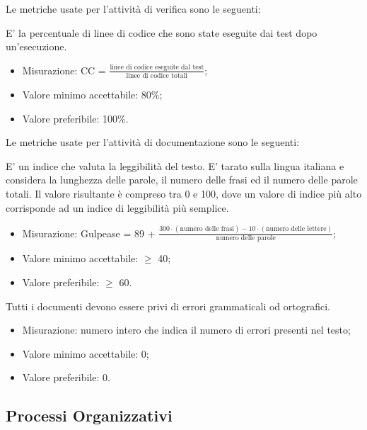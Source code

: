 	Le metriche usate per l'attività di verifica sono le seguenti:
	
		 E' la percentuale di linee di codice che sono state eseguite dai test dopo un’esecuzione.
		 \begin{itemize}
			\item{Misurazione: CC = $\displaystyle\frac{\mbox{linee di codice eseguite dal test}}{\mbox{linee di codice totali}}$;}
			\item{Valore minimo accettabile: 80\%;}
			\item{Valore preferibile: 100\%.}
		\end{itemize}
	
	Le metriche usate per l'attività di documentazione sono le seguenti:
	
		E' un indice che valuta la leggibilità del testo. E' tarato sulla lingua italiana e considera la lunghezza delle parole, il numero delle frasi ed il numero delle parole totali. Il valore risultante è compreso tra 0 e 100, dove un valore di indice più alto corrisponde ad un indice di leggibilità più semplice.
		 \begin{itemize}
			\item{Misurazione: Gulpease = 89 + $\displaystyle\frac{300 \cdot{} (\mbox{numero delle frasi}) - 10 \cdot{} (\mbox{numero delle lettere})}{\mbox{numero delle parole}}$;}
			\item{Valore minimo accettabile: $\geq$ 40;}
			\item{Valore preferibile: $\geq$ 60.}
		\end{itemize}

		Tutti i documenti devono essere privi di errori grammaticali od ortografici.
		\begin{itemize}
			\item{Misurazione: numero intero che indica il numero di errori presenti nel testo;}
			\item{Valore minimo accettabile: 0;}
			\item{Valore preferibile: 0.}
		\end{itemize}

\subsection{Processi Organizzativi}
